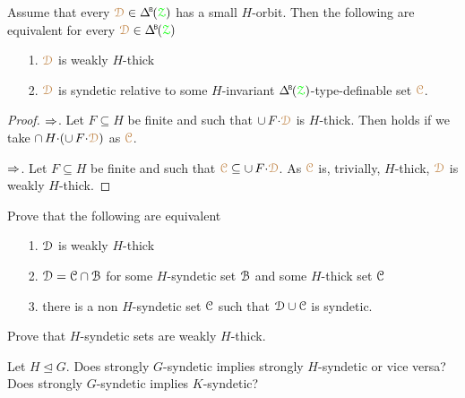 \begin{proposition}
  Assume that every $\mrD\in\BDelta(\grZ)$ has a small $H$-orbit.
  Then the following are equivalent for every $\mrD\in\BDelta(\grZ)$
  \begin{itemize}
    \item [1.] ${\color{brown}\EuScript D}$ is weakly $H$-thick
    \item [2.]${\color{brown}\EuScript D}$ is syndetic relative to some $H$-invariant $\BDelta(\grZ)$-type-definable set ${\color{brown}\EuScript C}$.
  \end{itemize}
\end{proposition}

\begin{proof}
  $\Rightarrow$. Let $F\subseteq H$ be finite and such that $\cup\,F{\cdot}{\color{brown}\EuScript D}$ is $H$-thick.
  Then  holds if we take $\cap\,H{\cdot}(\cup\,F{\cdot}{\color{brown}\EuScript D})$ as ${\color{brown}\EuScript C}$.

  $\Rightarrow$. Let $F\subseteq H$ be finite and such that ${\color{brown}\EuScript C}\subseteq\cup\,F{\cdot}{\color{brown}\EuScript D}$.
  As ${\color{brown}\EuScript C}$ is, trivially, $H$-thick, ${\color{brown}\EuScript D}$ is weakly $H$-thick.
\end{proof}


\begin{exercise}
  Prove that the following are equivalent
  \begin{itemize}
    \item[1.] $\EuScript D$ is weakly $H$-thick
    \item[2.] $\EuScript D=\EuScript C\cap\EuScript B$ for some $H$-syndetic set $\EuScript B$ and some $H$-thick set $\EuScript C$
    \item [3.] there is a non $H$-syndetic set $\EuScript C$ such that $\EuScript D\cup\EuScript C$ is syndetic.
  \end{itemize}
\end{exercise}

\begin{exercise}
  Prove that $H$-syndetic sets are weakly $H$-thick.
\end{exercise}

\begin{question}
  Let $H\trianglelefteq G$.
  Does strongly $G$-syndetic implies strongly $H$-syndetic or vice versa?
  Does strongly $G$-syndetic implies $K$-syndetic?
\end{question}

